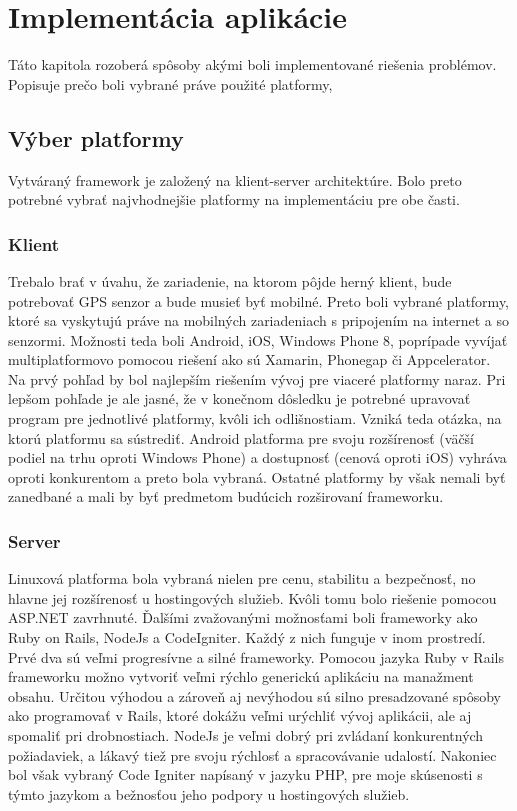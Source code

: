 \chapter{Implementácia aplikácie}
Táto kapitola rozoberá spôsoby akými boli implementované riešenia problémov. Popisuje prečo boli vybrané práve použité platformy,

\section{Výber platformy}
Vytváraný framework je založený na klient-server architektúre. Bolo preto potrebné vybrať najvhodnejšie platformy na implementáciu pre obe časti.
\subsection{Klient}
Trebalo brať v úvahu, že zariadenie, na ktorom pôjde herný klient, bude potrebovať GPS senzor a bude musieť byť mobilné. Preto boli vybrané platformy, ktoré sa vyskytujú práve na mobilných zariadeniach s pripojením na internet a so senzormi. Možnosti teda boli Android, iOS, Windows Phone 8, poprípade vyvíjať multiplatformovo pomocou riešení ako sú Xamarin, Phonegap či Appcelerator. Na prvý pohľad by bol najlepším riešením vývoj pre viaceré platformy naraz. Pri lepšom pohľade je ale jasné, že v konečnom dôsledku je potrebné upravovať program pre jednotlivé platformy, kvôli ich odlišnostiam. Vzniká teda otázka, na ktorú platformu sa sústrediť. Android platforma pre svoju rozšírenosť (väčší podiel na trhu oproti Windows Phone) a dostupnosť (cenová oproti iOS) vyhráva oproti konkurentom a preto bola vybraná. Ostatné platformy by však nemali byť zanedbané a mali by byť predmetom budúcich rozširovaní frameworku. 


\subsection{Server}
Linuxová platforma bola vybraná nielen pre cenu, stabilitu a bezpečnosť, no hlavne jej rozšírenosť u hostingových služieb. Kvôli tomu bolo riešenie pomocou ASP.NET zavrhnuté. Ďalšími zvažovanými možnosťami boli frameworky ako Ruby on Rails, NodeJs a CodeIgniter. Každý z nich funguje v inom prostredí. Prvé dva sú veľmi progresívne a silné frameworky. Pomocou jazyka Ruby v Rails frameworku možno vytvoriť veľmi rýchlo generickú aplikáciu na manažment obsahu. Určitou výhodou a zároveň aj nevýhodou sú silno presadzované spôsoby ako programovať v Rails, ktoré dokážu veľmi urýchliť vývoj aplikácii, ale aj spomaliť pri drobnostiach. NodeJs je veľmi dobrý pri zvládaní konkurentných požiadaviek, a lákavý tiež pre svoju rýchlosť a spracovávanie udalostí. Nakoniec bol však vybraný Code Igniter napísaný v jazyku PHP, pre moje skúsenosti s týmto jazykom a bežnosťou jeho podpory u hostingových služieb.


